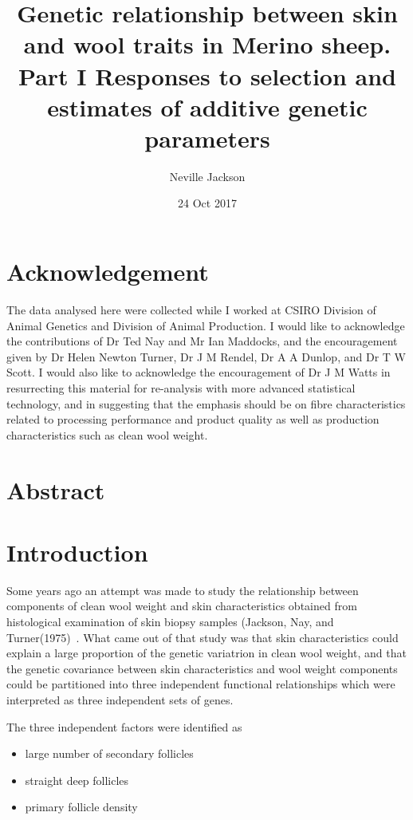 \documentclass[titlepage]{article}  %
\title{ Genetic relationship between skin and wool traits in Merino sheep. Part I Responses to selection and estimates of additive genetic parameters}
\author{Neville Jackson }
\date{24 Oct 2017}
\begin{document}
 
 
\maketitle      
\tableofcontents

\clearpage
\section{Acknowledgement}
The data analysed here were collected while I worked at CSIRO Division of Animal Genetics and Division of Animal Production. I would like to acknowledge the contributions of Dr Ted Nay and Mr Ian Maddocks, and the encouragement given by Dr Helen Newton Turner, Dr J M Rendel, Dr A A Dunlop, and Dr T W Scott. I would also like to acknowledge the encouragement of Dr J M Watts in resurrecting this material for re-analysis with more advanced statistical technology, and in suggesting that the emphasis should be on fibre characteristics related to processing performance and product quality as well as production characteristics such as clean wool weight.


\clearpage
\section{Abstract}

\clearpage
\section{Introduction} 
	Some years ago an attempt was made to study the relationship between components of clean wool weight and skin characteristics obtained from histological examination of skin biopsy samples (Jackson, Nay, and Turner(1975)~\cite{jack:75}. What came out of that study was that skin characteristics could explain a large proportion of the genetic variatrion in clean wool weight, and that the genetic covariance between skin characteristics and wool weight components could be partitioned into three independent functional relationships which were interpreted as three independent sets of genes.

	The three independent factors were identified as 
\begin{itemize}
\item large number of secondary follicles
\item straight deep follicles
\item primary follicle density
\end{itemize}
\end{document}
